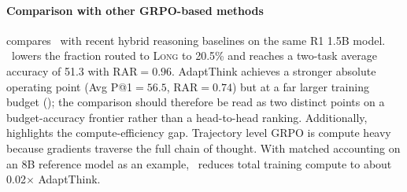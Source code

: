 \paragraph{Comparison with other GRPO-based methods}
 compares \Ours~with recent hybrid reasoning baselines on the same R1 1.5B model. \Ours~lowers the fraction routed to \textsc{Long} to 20.5\% and reaches a two-task average accuracy of 51.3 with RAR${=}0.96$. AdaptThink achieves a stronger absolute operating point (Avg P@1${=}56.5$, RAR${=}0.74$) but at a far larger training budget (); the comparison should therefore be read as two distinct points on a budget-accuracy frontier rather than a head-to-head ranking.
Additionally,  highlights the compute-efficiency gap. Trajectory level GRPO is compute heavy because gradients traverse the full chain of thought. With matched accounting on an 8B reference model as an example, \Ours~reduces total training compute to about 0.02$\times$ AdaptThink.
